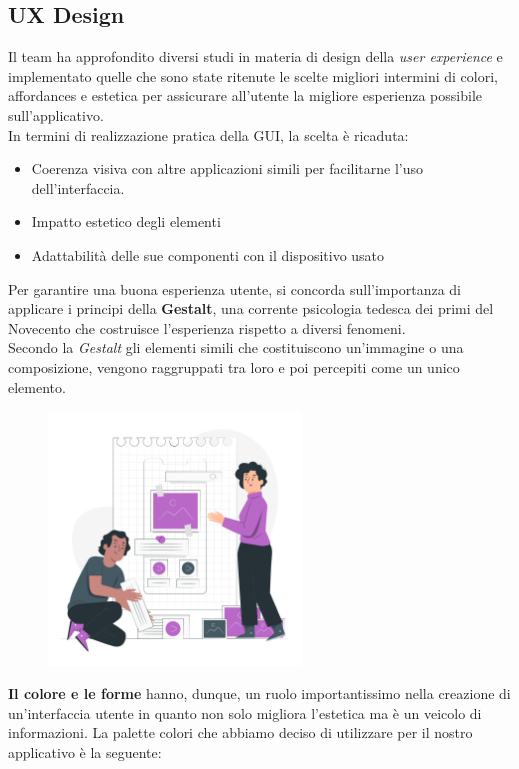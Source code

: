 \documentclass{article}
\begin{document}
		\subsection{UX Design}
		Il team ha approfondito diversi studi in materia di design della \textit{user experience} e implementato quelle che sono state ritenute le scelte migliori intermini di colori, affordances e estetica per assicurare all’utente la migliore esperienza possibile sull’applicativo.\\
		In termini di realizzazione pratica della GUI, la scelta è ricaduta:
		\begin{itemize}
			\item Coerenza visiva con altre applicazioni simili per facilitarne l'uso dell'interfaccia.
			\item Impatto estetico degli elementi
			\item Adattabilità delle sue componenti con il dispositivo usato
		\end{itemize}
		Per garantire una buona esperienza utente, si concorda sull'importanza di applicare i principi della \textbf{Gestalt}, una corrente psicologia tedesca dei primi del Novecento che costruisce l'esperienza rispetto a diversi fenomeni. 
		\\Secondo la \textit{Gestalt} gli elementi simili che costituiscono un'immagine o una composizione, vengono raggruppati tra loro e poi percepiti come un unico elemento.
		\begin{figure}[H]
			\centering
			\includegraphics[width=0.6\textwidth]{Immagini/uxdesign.png}
		\end{figure}
		\textbf{Il colore e le forme} hanno, dunque, un ruolo importantissimo nella creazione di un'interfaccia utente in quanto non solo migliora l'estetica ma è un veicolo di informazioni.
		La palette colori che abbiamo deciso di utilizzare per il nostro applicativo è la seguente:
\end{document}
